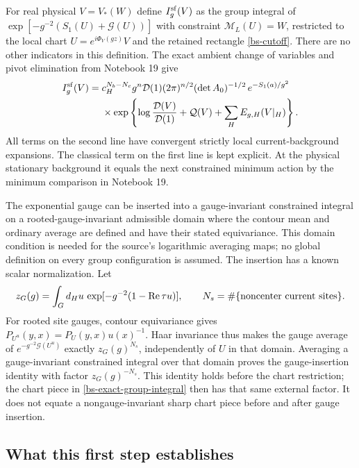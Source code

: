 \documentclass[11pt]{article}
\theoremstyle{remark}
\begin{document}
For real physical $V=V_*(W)$ define $I_g^{\rm sf}(V)$ as
the group integral of
$\exp[-g^{-2}(S_1(U)+\mathcal G(U))]$
with constraint $\mathcal M_L(U)=W$, restricted to the local
chart $U=e^{i\Phi_V(gz)}V$ and the retained rectangle
\eqref{bs-cutoff}. There are no other indicators in this
definition. The exact ambient change of variables and pivot
elimination from Notebook 19 give
\begin{equation}\label{bs-exact-group-integral}
 \begin{split}
 I_g^{\rm sf}(V)={}&
 c_H^{N_b-N_c}g^n\mathcal D(1)
       (2\pi)^{n/2}(\det A_0)^{-1/2}\,
       e^{-S_1(a)/g^2}\\
 &\times\exp\left\{
 \log\frac{\mathcal D(V)}{\mathcal D(1)}
               +\mathcal Q(V)+\sum_HE_{g,H}(V|_H)\right\}.
 \end{split}
\end{equation}
All terms on the second line have convergent strictly local
current-background expansions. The classical term on the
first line is kept explicit. At the physical stationary
background it equals the next constrained minimum action by
the minimum comparison in Notebook 19.

The exponential gauge can be inserted into a gauge-invariant
constrained integral on a rooted-gauge-invariant admissible
domain where the contour mean and ordinary average are defined
and have their stated equivariance. This domain condition is
needed for the source's logarithmic averaging maps; no global
definition on every group configuration is assumed. The
insertion has a known scalar normalization. Let
\begin{equation}\label{bs-gauge-normalization}
 z_G(g)=\int_G d_Hu\,
       \exp[-g^{-2}(1-\operatorname{Re}\tau u)],
 \qquad N_s=\#\{\hbox{noncenter current sites}\}.
\end{equation}
For rooted site gauges, contour equivariance gives
$P_{U^u}(y,x)=P_U(y,x)u(x)^{-1}$.
Haar invariance thus makes the gauge average of
$e^{-g^{-2}\mathcal G(U^u)}$ exactly $z_G(g)^{N_s}$,
independently of $U$ in that domain. Averaging a
gauge-invariant constrained integral over that domain proves
the gauge-insertion identity with factor
$z_G(g)^{-N_s}$. This identity holds before the chart
restriction; the chart piece in
\eqref{bs-exact-group-integral} then has that same external
factor. It does not equate a nongauge-invariant sharp chart
piece before and after gauge insertion.

\subsection{What this first step establishes}
\end{document}
